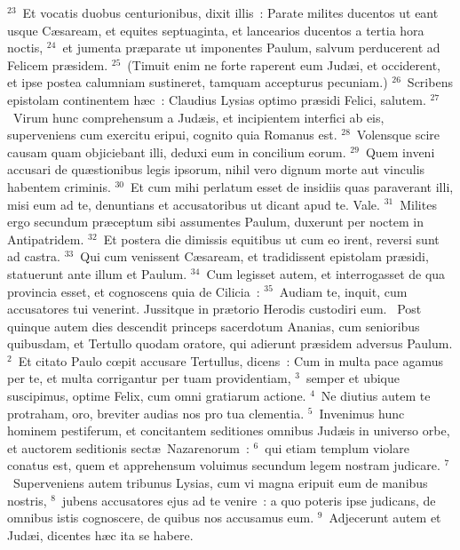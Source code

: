 ${}^{23}$~Et vocatis duobus centurionibus, dixit illis~: Parate milites ducentos ut eant usque C\ae saream, et equites septuaginta, et lancearios ducentos a tertia hora noctis,
${}^{24}$~et jumenta pr\ae parate ut imponentes Paulum, salvum perducerent ad Felicem pr\ae sidem.
${}^{25}$~(Timuit enim ne forte raperent eum Jud\ae i, et occiderent, et ipse postea calumniam sustineret, tamquam accepturus pecuniam.)
${}^{26}$~Scribens epistolam continentem h\ae c~: Claudius Lysias optimo pr\ae sidi Felici, salutem.
${}^{27}$~Virum hunc comprehensum a Jud\ae is, et incipientem interfici ab eis, superveniens cum exercitu eripui, cognito quia Romanus est.
${}^{28}$~Volensque scire causam quam objiciebant illi, deduxi eum in concilium eorum.
${}^{29}$~Quem inveni accusari de qu\ae stionibus legis ipsorum, nihil vero dignum morte aut vinculis habentem criminis.
${}^{30}$~Et cum mihi perlatum esset de insidiis quas paraverant illi, misi eum ad te, denuntians et accusatoribus ut dicant apud te. Vale.
${}^{31}$~Milites ergo secundum pr\ae ceptum sibi assumentes Paulum, duxerunt per noctem in Antipatridem.
${}^{32}$~Et postera die dimissis equitibus ut cum eo irent, reversi sunt ad castra.
${}^{33}$~Qui cum venissent C\ae saream, et tradidissent epistolam pr\ae sidi, statuerunt ante illum et Paulum.
${}^{34}$~Cum legisset autem, et interrogasset de qua provincia esset, et cognoscens quia de Cilicia~:
${}^{35}$~Audiam te, inquit, cum accusatores tui venerint. Jussitque in pr\ae torio Herodis custodiri eum.
~\lettrine[lines=10,image=true,loversize=0.05,lraise=-0.03]{P}{}ost quinque autem dies descendit princeps sacerdotum Ananias, cum senioribus quibusdam, et Tertullo quodam oratore, qui adierunt pr\ae sidem adversus Paulum.
${}^{2}$~Et citato Paulo cœpit accusare Tertullus, dicens~: Cum in multa pace agamus per te, et multa corrigantur per tuam providentiam,
${}^{3}$~semper et ubique suscipimus, optime Felix, cum omni gratiarum actione.
${}^{4}$~Ne diutius autem te protraham, oro, breviter audias nos pro tua clementia.
${}^{5}$~Invenimus hunc hominem pestiferum, et concitantem seditiones omnibus Jud\ae is in universo orbe, et auctorem seditionis sect\ae\ Nazarenorum~:
${}^{6}$~qui etiam templum violare conatus est, quem et apprehensum voluimus secundum legem nostram judicare.
${}^{7}$~Superveniens autem tribunus Lysias, cum vi magna eripuit eum de manibus nostris,
${}^{8}$~jubens accusatores ejus ad te venire~: a quo poteris ipse judicans, de omnibus istis cognoscere, de quibus nos accusamus eum.
${}^{9}$~Adjecerunt autem et Jud\ae i, dicentes h\ae c ita se habere.
